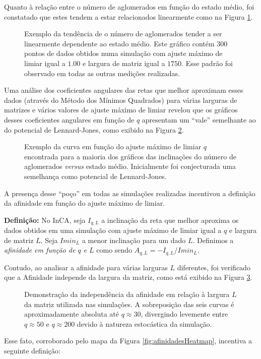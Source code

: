\documentclass[
	12pt,				%
	openright,			%
	twoside,			%
	a4paper,			%
	english,			%
	french,				%
	spanish,			%
	brazil				%
	]{abntex2}
\begin{document}
Quanto à relação entre o número de aglomerados em função do estado médio, foi constatado que estes tendem a estar relacionados linearmente como na Figura \ref{fig:dataL1750Q100ClustersVsAvgState}. 
\begin{figure}[h]
    \centering
    \caption{Exemplo da tendência de o número de aglomerados tender a ser linearmente dependente ao estado médio. Este gráfico contém 300 pontos de dados obtidos numa simulação com ajuste máximo de limiar igual a $1.00$ e largura de matriz igual a $1750$. Esse padrão foi observado em todas as outras medições realizadas.}
    \label{fig:dataL1750Q100ClustersVsAvgState}
\end{figure}
Uma análise dos coeficientes angulares das retas que melhor aproximam esses dados (através do Método dos Mínimos Quadrados) para várias larguras de matrizes e vários valores de ajuste máximo de limiar revelou que os gráficos desses coeficientes angulares em função de $q$ apresentam um ``vale'' semelhante ao do potencial de Lennard-Jones, como exibido na Figura \ref{fig:DadosSlopeL1000}.
\begin{figure}
    \centering
    \caption{Exemplo da curva  em função do ajuste máximo de limiar $q$ encontrada para a maioria dos gráficos das inclinações do número de aglomerados \textit{versus} estado médio. Inicialmente foi conjecturada uma semelhança como potencial de Lennard-Jones.}
    \label{fig:DadosSlopeL1000}
\end{figure}
A presença desse ``poço'' em todas as simulações realizadas incentivou a definição da afinidade em função do ajuste máximo de limiar.

\textbf{Definição:} No InCA, seja $I_{q,L}$ a inclinação da reta que melhor aproxima os dados obtidos em uma simulação com ajuste máximo de limiar igual a $q$ e largura de matriz $L$. Seja $Imin_L$ a menor inclinação para um dado $L$. Definimos a \textit{afinidade em função de $q$ e $L$} como sendo $A_{q,L}=-I_{q,L}/Imin_L$.

Contudo, ao analisar a afinidade para várias larguras $L$ diferentes, foi verificado que a Afinidade independe da largura da matriz, como está exibido na Figura \ref{fig:afinidadesQ0a200L750a2000}.
\begin{figure}
    \centering
    \caption{Demonstração da independência da afinidade em relação à largura $L$ da matriz utilizada nas simulações. A sobreposição das seis curvas é aproximadamente absoluta até $q\approx 30$, divergindo levemente entre $q\approx 50$ e $q\approx 200$ devido à natureza estocástica da simulação.}
    \label{fig:afinidadesQ0a200L750a2000}
\end{figure}
Esse fato, corroborado pelo mapa da Figura \ref{fig:afinidadesHeatmap},
incentiva a seguinte definição:
\end{document}
